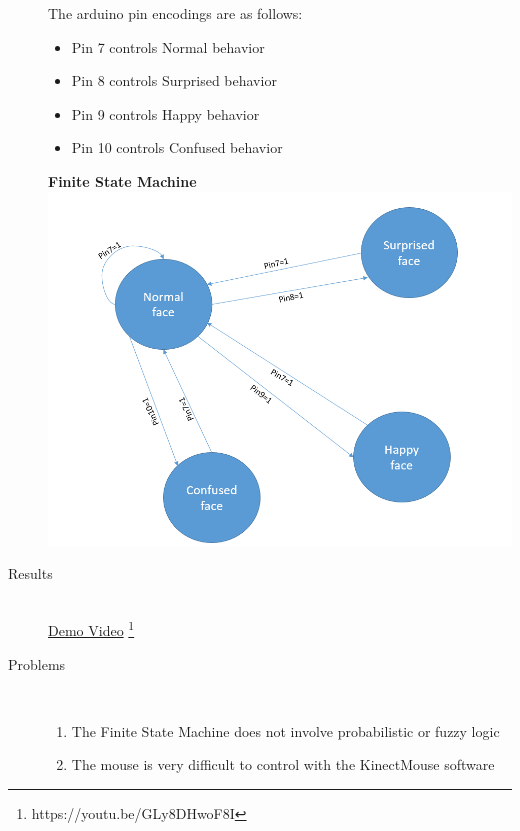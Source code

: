 \documentclass[12pt]{article}
\begin{document}
\begin{description}
		The arduino pin encodings are as follows:
		\begin{itemize}
			\item Pin 7 controls Normal behavior
			\item Pin 8 controls Surprised behavior
			\item Pin 9 controls Happy behavior
			\item Pin 10 controls Confused behavior
		\end{itemize}
		\newpage
		\textbf{Finite State Machine} \\
		\includegraphics[scale=.45]{FSM.PNG} \\
		
	\item[Results] \hfill \\
		
		\href{https://youtu.be/GLy8DHwoF8I}{Demo Video} \footnote{https://youtu.be/GLy8DHwoF8I}
		
	\item[Problems] \hfill \\
		\begin{enumerate}
			\item The Finite State Machine does not involve probabilistic or fuzzy logic
			\item The mouse is very difficult to control with the KinectMouse software
		\end{enumerate}
\end{description}
\end{document}

